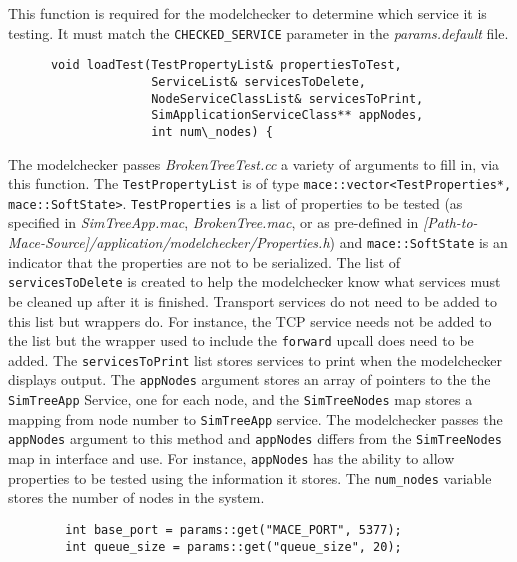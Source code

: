 \documentclass[12pt,letterpaper]{article}
\newenvironment{code}
{\begin{list}{}{\setlength{\leftmargin}{1em}}\item\scriptsize\bfseries}
{\end{list}}
\begin{document}
This function is required for the modelchecker to determine which service it is testing.  It must match the \texttt{CHECKED\_SERVICE} parameter in the \emph{params.default} file.

\begin{code}
\begin{verbatim} 
      void loadTest(TestPropertyList& propertiesToTest, 
                    ServiceList& servicesToDelete, 
                    NodeServiceClassList& servicesToPrint, 
                    SimApplicationServiceClass** appNodes, 
                    int num\_nodes) {
\end{verbatim}
\end{code}

The modelchecker passes \emph{BrokenTreeTest.cc} a variety of arguments to fill in, via this function. The \texttt{TestPropertyList} is of type \texttt{mace::vector<TestProperties*, mace::SoftState>}.  \texttt{TestProperties} is a list of properties to be tested (as specified in \emph{SimTreeApp.mac}, \emph{BrokenTree.mac}, or as pre-defined in \emph{[Path-to-Mace-Source]/application/modelchecker/Properties.h}) and \texttt{mace::SoftState} is an indicator that the properties are not to be serialized.  The list of \texttt{servicesToDelete} is created to help the modelchecker know what services must be cleaned up after it is finished.  Transport services do not need to be added to this list but wrappers do.  For instance, the TCP service needs not be added to the list but the wrapper used to include the \texttt{forward} upcall does need to be added.  The \texttt{servicesToPrint} list stores services to print when the modelchecker displays output.  The \texttt{appNodes} argument stores an array of pointers to the the \texttt{SimTreeApp} Service, one for each node, and the \texttt{SimTreeNodes} map stores a mapping from node number to \texttt{SimTreeApp} service.  The modelchecker passes the \texttt{appNodes} argument to this method and \texttt{appNodes} differs from the \texttt{SimTreeNodes} map in interface and use.  For instance, \texttt{appNodes} has the ability to allow properties to be tested using the information it stores.  The \texttt{num\_nodes} variable stores the number of nodes in the system.  

\begin{code}
\begin{verbatim} 
        int base_port = params::get("MACE_PORT", 5377);
        int queue_size = params::get("queue_size", 20);
\end{verbatim}
\end{code}
\end{document}
